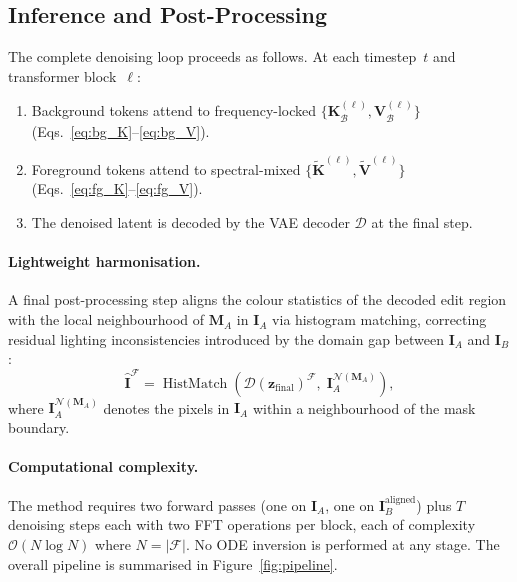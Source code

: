 \subsection{Inference and Post-Processing}

The complete denoising loop proceeds as follows.
At each timestep~$t$ and transformer block~$\ell$:
\begin{enumerate}
    \item Background tokens attend to frequency-locked
          $\{\mathbf{K}_{\mathcal{B}}^{(\ell)}, \mathbf{V}_{\mathcal{B}}^{(\ell)}\}$
          (Eqs.~\eqref{eq:bg_K}--\eqref{eq:bg_V}).
    \item Foreground tokens attend to spectral-mixed
          $\{\tilde{\mathbf{K}}^{(\ell)}, \tilde{\mathbf{V}}^{(\ell)}\}$
          (Eqs.~\eqref{eq:fg_K}--\eqref{eq:fg_V}).
    \item The denoised latent is decoded by the VAE decoder $\mathcal{D}$ at the final step.
\end{enumerate}

\paragraph{Lightweight harmonisation.}
A final post-processing step aligns the colour statistics of the decoded edit region with the
local neighbourhood of $\mathbf{M}_A$ in $\mathbf{I}_A$ via histogram matching, correcting
residual lighting inconsistencies introduced by the domain gap between
$\mathbf{I}_A$ and $\mathbf{I}_B$:
\begin{equation}
    \hat{\mathbf{I}}^{\mathcal{F}}
        = \operatorname{HistMatch}\!\left(
              \mathcal{D}(\mathbf{z}_{\text{final}})^{\mathcal{F}},\;
              \mathbf{I}_A^{\mathcal{N}(\mathbf{M}_A)}
          \right),
    \label{eq:histmatch}
\end{equation}
where $\mathbf{I}_A^{\mathcal{N}(\mathbf{M}_A)}$ denotes the pixels in $\mathbf{I}_A$
within a neighbourhood of the mask boundary.

\paragraph{Computational complexity.}
The method requires two forward passes (one on $\mathbf{I}_A$, one on
$\mathbf{I}_B^{\text{aligned}}$) plus $T$ denoising steps each with two FFT operations per
block, each of complexity $\mathcal{O}(N \log N)$ where $N = |\mathcal{F}|$.
No ODE inversion is performed at any stage.
The overall pipeline is summarised in Figure~\ref{fig:pipeline}.
